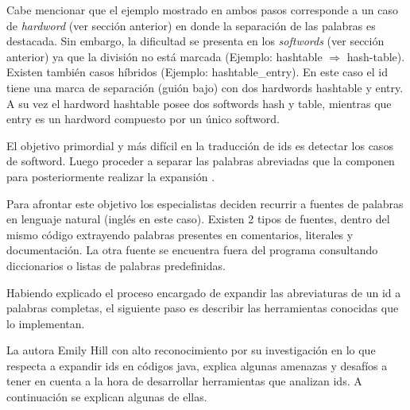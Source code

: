 \documentclass[a4paper,12pt]{report}
\begin{document}
Cabe mencionar que el ejemplo mostrado en ambos pasos corresponde a un caso de \textit{hardword} (ver sección anterior) en donde la separación de las palabras es destacada. Sin embargo, la dificultad se presenta en los \textit{softwords} (ver sección anterior) ya que la división no está marcada (Ejemplo: \textsf{hashtable} $\Rightarrow$ \textsf{hash-table}). Existen también casos híbridos (Ejemplo: \textsf{hashtable\_entry}). En este caso el id tiene una marca de separación (guión bajo) con dos hardwords \textsf{hashtable} y \textsf{entry}. A su vez el hardword \textsf{hashtable} posee dos softwords \textsf{hash} y \textsf{table}, mientras que \textsf{entry} es un hardword compuesto por un único softword. 

\begin{framed}
\noindent El objetivo primordial y más difícil en la traducción de ids es detectar los casos de softword. Luego proceder a separar las palabras abreviadas que la componen para posteriormente realizar la expansión \cite{FBL06,LFBEX07}.  
\end{framed}

Para afrontar este objetivo los especialistas deciden recurrir a fuentes de palabras en lenguaje natural (inglés en este caso). Existen 2 tipos de fuentes, dentro del mismo código extrayendo palabras presentes en comentarios, literales y documentación. La otra fuente se encuentra fuera del programa consultando diccionarios o listas de palabras predefinidas. 

Habiendo explicado el proceso encargado de expandir las abreviaturas de un id a palabras completas, el siguiente paso es describir las herramientas conocidas que lo implementan. 

La autora Emily Hill \cite{EZH08} con alto reconocimiento por su investigación en lo que respecta a expandir ids en códigos java, explica algunas amenazas y desafíos a tener en cuenta a la hora de desarrollar herramientas que analizan ids. A continuación se explican algunas de ellas.
\end{document}
